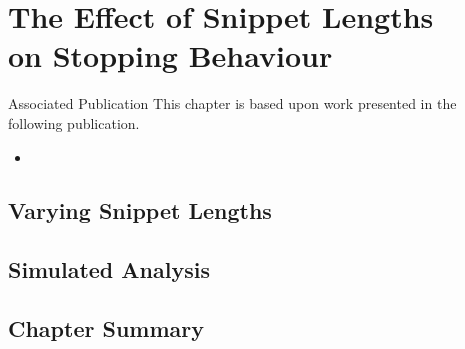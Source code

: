 
\chapter[The Effects of Snippet Lengths on Stopping Behaviour]{The Effect of Snippet Lengths\\on Stopping Behaviour}\label{chap:snippets}

\begin{publications_box}{Associated Publication}
This chapter is based upon work presented in the following publication.
\vspace*{-3mm}
\begin{itemize}
    \item{}
\end{itemize}
\end{publications_box}

\section{Varying Snippet Lengths}

\section{Simulated Analysis}

\section{Chapter Summary}